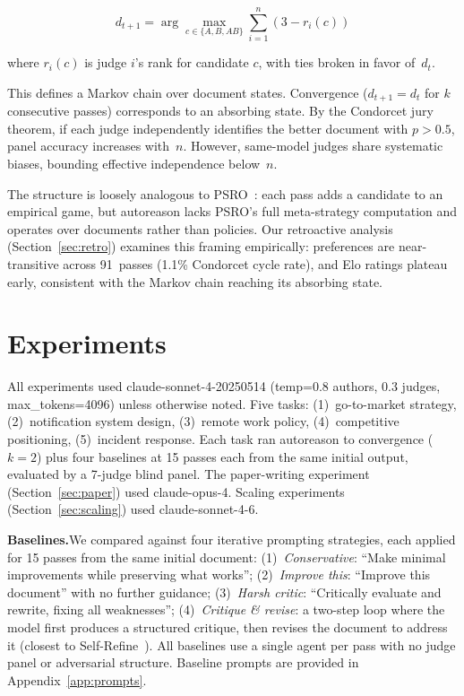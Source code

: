 \documentclass[10pt,twocolumn]{article}
\begin{document}
$$d_{t+1} = \arg\max_{c \in \{A, B, AB\}} \sum_{i=1}^{n} (3 - r_i(c))$$

where $r_i(c)$ is judge $i$'s rank for candidate $c$, with ties broken in favor of~$d_t$.

This defines a Markov chain over document states. Convergence ($d_{t+1} = d_t$ for $k$ consecutive passes) corresponds to an absorbing state. By the Condorcet jury theorem, if each judge independently identifies the better document with $p > 0.5$, panel accuracy increases with~$n$. However, same-model judges share systematic biases, bounding effective independence below~$n$.

The structure is loosely analogous to PSRO~\cite{psro}: each pass adds a candidate to an empirical game, but autoreason lacks PSRO's full meta-strategy computation and operates over documents rather than policies. Our retroactive analysis (Section~\ref{sec:retro}) examines this framing empirically: preferences are near-transitive across 91~passes (1.1\% Condorcet cycle rate), and Elo ratings plateau early, consistent with the Markov chain reaching its absorbing state.

\section{Experiments}

All experiments used claude-sonnet-4-20250514 (temp=0.8 authors, 0.3 judges, max\_tokens=4096) unless otherwise noted. Five tasks: (1)~go-to-market strategy, (2)~notification system design, (3)~remote work policy, (4)~competitive positioning, (5)~incident response. Each task ran autoreason to convergence ($k{=}2$) plus four baselines at 15 passes each from the same initial output, evaluated by a 7-judge blind panel. The paper-writing experiment (Section~\ref{sec:paper}) used claude-opus-4. Scaling experiments (Section~\ref{sec:scaling}) used claude-sonnet-4-6.

\textbf{Baselines.}\enspace We compared against four iterative prompting strategies, each applied for 15 passes from the same initial document: (1)~\textit{Conservative}: ``Make minimal improvements while preserving what works''; (2)~\textit{Improve this}: ``Improve this document'' with no further guidance; (3)~\textit{Harsh critic}: ``Critically evaluate and rewrite, fixing all weaknesses''; (4)~\textit{Critique \& revise}: a two-step loop where the model first produces a structured critique, then revises the document to address it (closest to Self-Refine~\cite{selfrefine}). All baselines use a single agent per pass with no judge panel or adversarial structure. Baseline prompts are provided in Appendix~\ref{app:prompts}.
\end{document}
